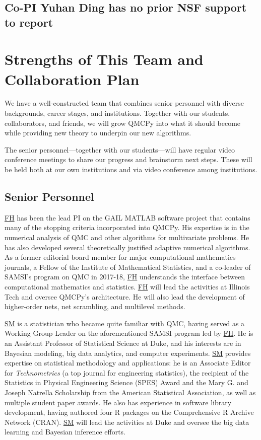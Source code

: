 \documentclass[11pt]{NSFamsart}
\newcommand{\FH}{\hyperlink{FHlink}{FH}\xspace}
\newcommand{\SM}{\hyperlink{SMlink}{SM}\xspace}
\begin{document}
\subsection{Co-PI Yuhan Ding has no prior NSF support to report}

\section{Strengths of This Team and Collaboration Plan}
We have a well-constructed  team that combines senior personnel with diverse backgrounds, career stages, and institutions.  Together with our students, collaborators, and friends, we will grow QMCPy into what it should become while providing new theory to underpin our new algorithms.

The senior personnel---together with our students---will have regular video conference meetings to share our progress and brainstorm next steps. These will be held both at our own institutions and via video conference among institutions.



\subsection{Senior Personnel}
\FH has been the lead PI on the GAIL \cite{ChoEtal20a} MATLAB software project that contains many of the stopping criteria incorporated into QMCPy.  His expertise is in the numerical analysis of QMC and other algorithms for multivariate problems.  He has also developed several theoretically justified adaptive numerical algorithms.  As a former editorial board member for major computational mathematics journals, a Fellow of the Institute of Mathematical Statistics, and a co-leader of SAMSI's program on QMC in 2017-18, \FH understands the interface between computational mathematics and statistics.  \FH will lead the activities at Illinois Tech and oversee QMCPy's architecture.  He will also lead the development of higher-order nets, net scrambling, and multilevel methods.

\SM is a statistician who became quite familiar with QMC, having served as a Working Group Leader on the aforementioned SAMSI program led by \FH. He is an Assistant Professor of Statistical Science at Duke, and his interests are in Bayesian modeling, big data analytics, and computer experiments. \SM provides expertise on statistical methodology and applications: he is an Associate Editor for \textit{Technometrics} (a top journal for engineering statistics), the recipient of the Statistics in Physical Engineering Science (SPES) Award and the Mary G. and Joseph Natrella Scholarship from the American Statistical Association, as well as multiple student paper awards. He also has experience in software library development, having authored four \textsc{R} packages \cite{support,minimaxdesign,cmenet,atmopt} on the Comprehensive R Archive Network (CRAN). \SM will lead the activities at Duke and oversee the big data learning and Bayesian inference efforts.
\end{document}
